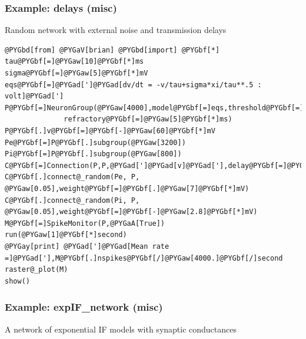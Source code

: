 \documentclass[letterpaper,10pt,english]{manual}
\begin{document}
\resetcurrentobjects
\hypertarget{--doc-examples-misc_delays}{}

\hypertarget{index-63}{}\subsubsection{Example: delays (misc)}

Random network with external noise and transmission delays

\begin{Verbatim}[commandchars=@\[\]]
@PYGbd[from] @PYGaV[brian] @PYGbd[import] @PYGbf[*]
tau@PYGbf[=]@PYGaw[10]@PYGbf[*]ms
sigma@PYGbf[=]@PYGaw[5]@PYGbf[*]mV
eqs@PYGbf[=]@PYGad[']@PYGad[dv/dt = -v/tau+sigma*xi/tau**.5 : volt]@PYGad[']
P@PYGbf[=]NeuronGroup(@PYGaw[4000],model@PYGbf[=]eqs,threshold@PYGbf[=]@PYGaw[10]@PYGbf[*]mV,reset@PYGbf[=]@PYGaw[0]@PYGbf[*]mV,\
              refractory@PYGbf[=]@PYGaw[5]@PYGbf[*]ms)
P@PYGbf[.]v@PYGbf[=]@PYGbf[-]@PYGaw[60]@PYGbf[*]mV
Pe@PYGbf[=]P@PYGbf[.]subgroup(@PYGaw[3200])
Pi@PYGbf[=]P@PYGbf[.]subgroup(@PYGaw[800])
C@PYGbf[=]Connection(P,P,@PYGad[']@PYGad[v]@PYGad['],delay@PYGbf[=]@PYGaw[2]@PYGbf[*]ms)
C@PYGbf[.]connect@_random(Pe, P, @PYGaw[0.05],weight@PYGbf[=]@PYGbf[.]@PYGaw[7]@PYGbf[*]mV)
C@PYGbf[.]connect@_random(Pi, P, @PYGaw[0.05],weight@PYGbf[=]@PYGbf[-]@PYGaw[2.8]@PYGbf[*]mV)
M@PYGbf[=]SpikeMonitor(P,@PYGaA[True])
run(@PYGaw[1]@PYGbf[*]second)
@PYGay[print] @PYGad[']@PYGad[Mean rate =]@PYGad['],M@PYGbf[.]nspikes@PYGbf[/]@PYGaw[4000.]@PYGbf[/]second
raster@_plot(M)
show()
\end{Verbatim}

\resetcurrentobjects
\hypertarget{--doc-examples-misc_expIF_network}{}

\hypertarget{index-64}{}\subsubsection{Example: expIF\_network (misc)}

A network of exponential IF models with synaptic conductances
\end{document}
